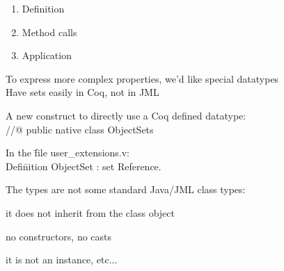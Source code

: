 \begin{enumerate}
\item Definition
\item Method calls
\item Application
\end{enumerate}
\small
\blist
\item To express more complex properties, we'd like special datatypes\\
\rarrow Have sets easily in Coq, not in JML 
\item A new construct to directly use a Coq defined datatype:\\
//@  public {\purple native} class ObjectSets 
\begin{tabbing}
In the \=file user\_extensions.v:\+\\
  {\purple Defi}\={\purple nition} ObjectSet : set Reference.
\end{tabbing}
\item The types are not some standard Java/JML class types:
\blist
\item it does not inherit from the class object
\item no constructors, no casts
\item it is not an instance, etc...

